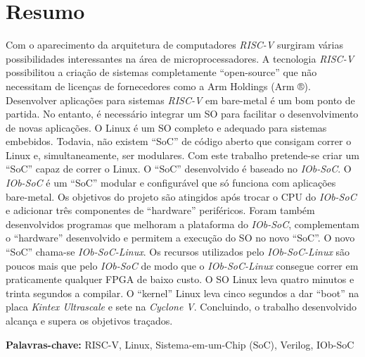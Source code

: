 \cleardoubleoddpage

\chapter*{Resumo}
\thispagestyle{empty} %

Com o aparecimento da arquitetura de computadores \textit{RISC-V} surgiram várias possibilidades interessantes na área de microprocessadores. A tecnologia \textit{RISC-V} possibilitou a criação de sistemas completamente “open-source” que não necessitam de licenças de fornecedores como a Arm Holdings (Arm ®). Desenvolver aplicações para sistemas \textit{RISC-V} em bare-metal é um bom ponto de partida. No entanto, é necessário integrar um SO para facilitar o desenvolvimento de novas aplicações. O Linux é um SO completo e adequado para sistemas embebidos. Todavia, não existem “SoC” de código aberto que consigam correr o Linux e, simultaneamente, ser modulares.
%  
Com este trabalho pretende-se criar um “SoC” capaz de correr o Linux. O “SoC” desenvolvido é baseado no \textit{IOb-SoC}. O \textit{IOb-SoC} é um “SoC” modular e configurável que só funciona com aplicações bare-metal. Os objetivos do projeto são atingidos após trocar o CPU do \textit{IOb-SoC} e adicionar três componentes de “hardware” periféricos. Foram também desenvolvidos programas que melhoram a plataforma do \textit{IOb-SoC}, complementam o “hardware” desenvolvido e permitem a execução do SO no novo “SoC”. O novo “SoC” chama-se \textit{IOb-SoC-Linux}.  
%  
Os recursos utilizados pelo \textit{IOb-SoC-Linux} são poucos mais que pelo \textit{IOb-SoC} de modo que o \textit{IOb-SoC-Linux} consegue correr em praticamente qualquer FPGA de baixo custo. O SO Linux leva quatro minutos e trinta segundos a compilar. O “kernel” Linux leva cinco segundos a dar “boot” na placa \textit{Kintex Ultrascale} e sete na \textit{Cyclone V}. Concluindo, o trabalho desenvolvido alcança e supera os objetivos traçados.

\vfill

\textbf{\Large Palavras-chave:} RISC-V, Linux, Sistema-em-um-Chip (SoC), Verilog, IOb-SoC

